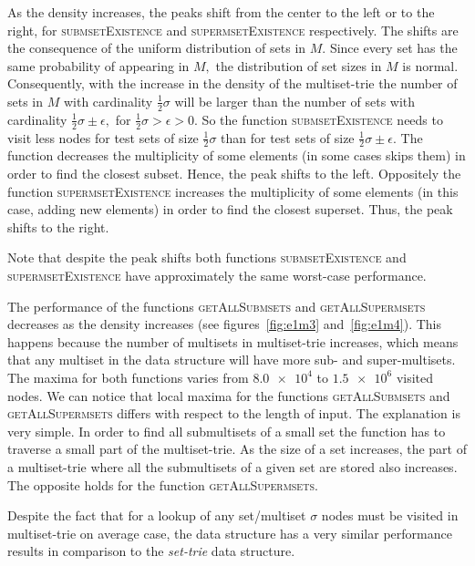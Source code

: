 As the density increases, the peaks shift from the center to the left or to the right, 
for \textsc{submsetExistence} and \textsc{supermsetExistence} respectively. 
The shifts are the consequence of the uniform distribution of sets in $M.$ 
Since every set has the same probability of appearing in $M,$ the distribution of set 
sizes in $M$ is normal. Consequently, with the increase in the density of the 
multiset-trie the number of sets in $M$ with cardinality $\frac{1}{2}\sigma$ will be 
larger than the number of sets with cardinality $\frac{1}{2}\sigma\pm\epsilon,$ 
for $\frac{1}{2}\sigma > \epsilon > 0.$ So the function \textsc{submsetExistence} 
needs to visit less nodes for test sets of size $\frac{1}{2}\sigma$ than for test 
sets of size $\frac{1}{2}\sigma\pm\epsilon.$ The function decreases the 
multiplicity of some elements (in some cases skips them) in order to find the 
closest subset. Hence, the peak shifts to the left. Oppositely the function 
\textsc{supermsetExistence} increases the multiplicity of some elements 
(in this case, adding new elements) in order to find the closest superset. 
Thus, the peak shifts to the right.

Note that despite the peak shifts both functions \textsc{submsetExistence} and 
\textsc{supermsetExistence} have approximately the same worst-case performance. 

The performance of the functions \textsc{getAllSubmsets} and \textsc{getAllSupermsets} 
decreases as the density increases (see figures~\ref{fig:e1m3} and~\ref{fig:e1m4}). 
This happens because the number of multisets in multiset-trie increases, which means 
that any multiset in the data structure will have more sub- and super-multisets. 
The maxima for both functions varies from $\num{8.0e4}$ to $\num{1.5e6}$ visited nodes. 
We can notice that local maxima for the functions \textsc{getAllSubmsets} and 
\textsc{getAllSupermsets} differs with respect to the length of input. The 
explanation is very simple. In order to find all submultisets of a small set the 
function has to traverse a small part of the multiset-trie. As the size of a set 
increases, the part of a multiset-trie where all the submultisets of a given set 
are stored also increases. The opposite holds for the function 
\textsc{getAllSupermsets}.


Despite the fact that for a lookup of any set/multiset $\sigma$ nodes must be visited 
in multiset-trie on average case, the data structure has a very similar performance 
results in comparison to the \emph{set-trie} data structure.

